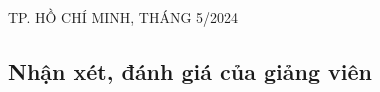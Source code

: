 \documentclass[a4paper]{article}
\begin{document}
\begin{titlepage}
	\begin{center}

		{\footnotesize TP. HỒ CHÍ MINH, THÁNG 5/2024}
	\end{center}
\end{titlepage}


\thispagestyle{empty}
\newpage
\begin{center}
	\section*{Nhận xét, đánh giá của giảng viên}
\end{center}
\begin{flushleft}
	\dotfill
\end{flushleft}
\begin{flushleft}
	\dotfill
\end{flushleft}
\begin{flushleft}
	\dotfill
\end{flushleft}
\begin{flushleft}
	\dotfill
\end{flushleft}
\begin{flushleft}
	\dotfill
\end{flushleft}
\begin{flushleft}
	\dotfill
\end{flushleft}
\begin{flushleft}
	\dotfill
\end{flushleft}
\begin{flushleft}
	\dotfill
\end{flushleft}
\begin{flushleft}
	\dotfill
\end{flushleft}
\begin{flushleft}
	\dotfill
\end{flushleft}
\begin{flushleft}
	\dotfill
\end{flushleft}
\begin{flushleft}
	\dotfill
\end{flushleft}
\begin{flushleft}
	\dotfill
\end{flushleft}
\begin{flushleft}
	\dotfill
\end{flushleft}
\begin{flushleft}
	\dotfill
\end{flushleft}
\begin{flushleft}
	\dotfill
\end{flushleft}
\end{document}
